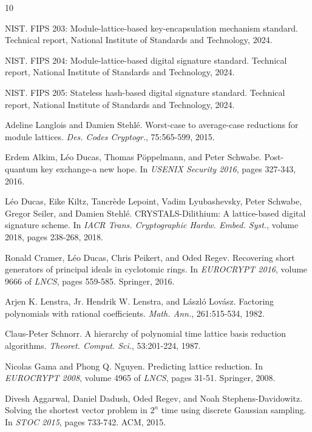 \documentclass[11pt,a4paper]{article}
\theoremstyle{plain}
\theoremstyle{definition}
\theoremstyle{remark}
\begin{document}
\begin{thebibliography}{10}

{NIST}.
 {FIPS 203}: Module-lattice-based key-encapsulation mechanism standard.
 Technical report, National Institute of Standards and Technology, 2024.

{NIST}.
 {FIPS 204}: Module-lattice-based digital signature standard.
 Technical report, National Institute of Standards and Technology, 2024.

{NIST}.
 {FIPS 205}: Stateless hash-based digital signature standard.
 Technical report, National Institute of Standards and Technology, 2024.

Adeline Langlois and Damien Stehl\'{e}.
 Worst-case to average-case reductions for module lattices.
 {\em Des.  Codes Cryptogr.}, 75:565-599, 2015.

Erdem Alkim, L\'{e}o Ducas, Thomas P\"{o}ppelmann, and Peter Schwabe.
 Post-quantum key exchange-a new hope.
 In {\em USENIX Security 2016}, pages 327-343, 2016.

L\'{e}o Ducas, Eike Kiltz, Tancr\`{e}de Lepoint, Vadim Lyubashevsky, Peter Schwabe, Gregor Seiler, and Damien Stehl\'{e}.
 {CRYSTALS-Dilithium}: A lattice-based digital signature scheme.
 In {\em IACR Trans. Cryptographic Hardw. Embed.  Syst.}, volume 2018, pages 238-268, 2018.

Ronald Cramer, L\'{e}o Ducas, Chris Peikert, and Oded Regev.
 Recovering short generators of principal ideals in cyclotomic rings.
 In {\em EUROCRYPT 2016}, volume 9666 of {\em LNCS}, pages 559-585. Springer, 2016.

Arjen K. Lenstra, Jr. Hendrik W. Lenstra, and L\'{a}szl\'{o} Lov\'{a}sz.
 Factoring polynomials with rational coefficients.
 {\em Math.  Ann.}, 261:515-534, 1982.

Claus-Peter Schnorr.
 A hierarchy of polynomial time lattice basis reduction algorithms.
 {\em Theoret.  Comput.  Sci.}, 53:201-224, 1987.

Nicolas Gama and Phong Q. Nguyen.
 Predicting lattice reduction.
 In {\em EUROCRYPT 2008}, volume 4965 of {\em LNCS}, pages 31-51. Springer, 2008.

Divesh Aggarwal, Daniel Dadush, Oded Regev, and Noah Stephens-Davidowitz.
 Solving the shortest vector problem in $2^n$ time using discrete {G}aussian sampling.
 In {\em STOC 2015}, pages 733-742. ACM, 2015.


\end{thebibliography}
\end{document}
